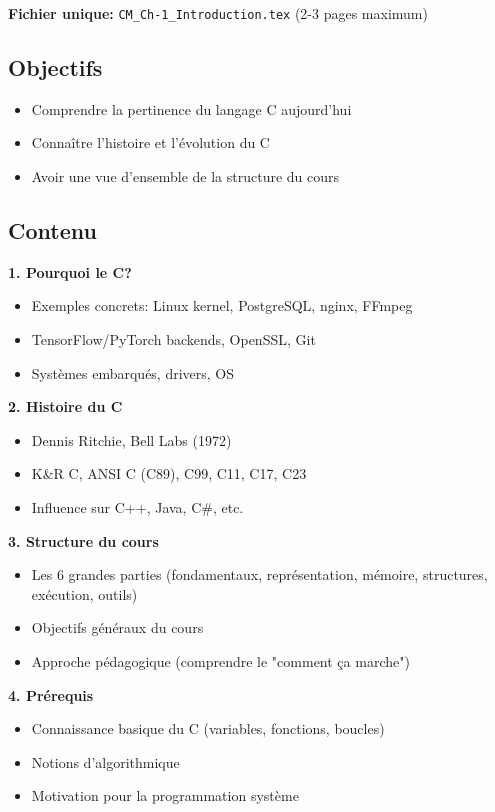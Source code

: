\documentclass[10pt,a4paper]{article}
\begin{document}
\textbf{Fichier unique:} \texttt{CM\_Ch-1\_Introduction.tex} (2-3 pages maximum)

\subsection*{Objectifs}
\begin{itemize}
\item Comprendre la pertinence du langage C aujourd'hui
\item Connaître l'histoire et l'évolution du C
\item Avoir une vue d'ensemble de la structure du cours
\end{itemize}

\subsection*{Contenu}

\textbf{1. Pourquoi le C?}
\begin{itemize}
\item Exemples concrets: Linux kernel, PostgreSQL, nginx, FFmpeg
\item TensorFlow/PyTorch backends, OpenSSL, Git
\item Systèmes embarqués, drivers, OS
\end{itemize}

\textbf{2. Histoire du C}
\begin{itemize}
\item Dennis Ritchie, Bell Labs (1972)
\item K\&R C, ANSI C (C89), C99, C11, C17, C23
\item Influence sur C++, Java, C\#, etc.
\end{itemize}

\textbf{3. Structure du cours}
\begin{itemize}
\item Les 6 grandes parties (fondamentaux, représentation, mémoire, structures, exécution, outils)
\item Objectifs généraux du cours
\item Approche pédagogique (comprendre le "comment ça marche")
\end{itemize}

\textbf{4. Prérequis}
\begin{itemize}
\item Connaissance basique du C (variables, fonctions, boucles)
\item Notions d'algorithmique
\item Motivation pour la programmation système
\end{itemize}
\end{document}
